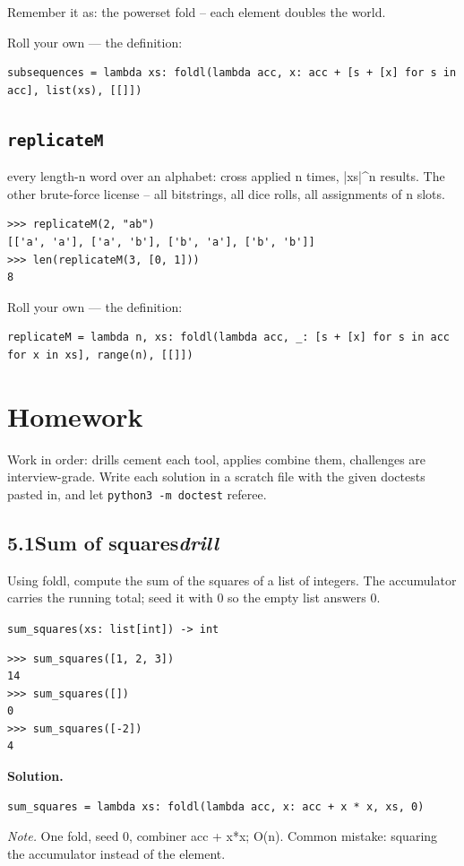 \documentclass[10pt,letterpaper]{book}
\begin{document}
Remember it as: the powerset fold -- each element doubles the world.


Roll your own --- the definition:

\begin{lstlisting}[style=ex]
subsequences = lambda xs: foldl(lambda acc, x: acc + [s + [x] for s in acc], list(xs), [[]])
\end{lstlisting}

\subsection{\texttt{replicateM}}\label{def:replicateM}
every length-n word over an alphabet: cross applied n times, |xs|\^{}n results. The other brute-force license -- all bitstrings, all dice rolls, all assignments of n slots.
\begin{lstlisting}[style=ex]
>>> replicateM(2, "ab")
[['a', 'a'], ['a', 'b'], ['b', 'a'], ['b', 'b']]
>>> len(replicateM(3, [0, 1]))
8
\end{lstlisting}

Roll your own --- the definition:

\begin{lstlisting}[style=ex]
replicateM = lambda n, xs: foldl(lambda acc, _: [s + [x] for s in acc for x in xs], range(n), [[]])
\end{lstlisting}
\section{Homework}
Work in order: drills cement each tool, applies combine them,
challenges are interview-grade. Write each solution in a scratch file with
the given doctests pasted in, and let \texttt{python3 -m doctest} referee.
\subsection*{5.1\quad Sum of squares\hfill\textnormal{\textit{drill}}}
Using foldl, compute the sum of the squares of a list of integers. The accumulator carries the running total; seed it with 0 so the empty list answers 0.

\noindent\texttt{sum\_squares(xs: list[int]) -> int}
\begin{lstlisting}[style=ex]
>>> sum_squares([1, 2, 3])
14
>>> sum_squares([])
0
>>> sum_squares([-2])
4
\end{lstlisting}
\noindent\textbf{Solution.}
\begin{lstlisting}[style=code]
sum_squares = lambda xs: foldl(lambda acc, x: acc + x * x, xs, 0)
\end{lstlisting}
\noindent\textit{Note.} One fold, seed 0, combiner acc + x*x; O(n). Common mistake: squaring the accumulator instead of the element.
\end{document}
